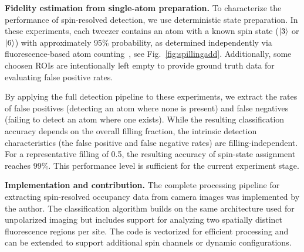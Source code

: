 \textbf{Fidelity estimation from single-atom preparation.}  
To characterize the performance of spin-resolved detection, we use deterministic state preparation. In these experiments, each tweezer contains an atom with a known spin state ($\left| 3 \right\rangle$ or $\left| 6 \right\rangle$) with approximately 95\% probability, as determined independently via fluorescence-based atom counting~\cite{dux_optical_2023}, see Fig.~\ref{fig:spillingadd}. Additionally, some choosen ROIs are intentionally left empty to provide ground truth data for evaluating false positive rates.

By applying the full detection pipeline to these experiments, we extract the rates of false positives (detecting an atom where none is present) and false negatives (failing to detect an atom where one exists). While the resulting classification accuracy depends on the overall filling fraction, the intrinsic detection characteristics (the false positive and false negative rates) are filling-independent. For a representative filling of 0.5, the resulting accuracy of spin-state assignment reaches 99\%. This performance level is sufficient for the current experiment stage.

\textbf{Implementation and contribution.}  
The complete processing pipeline for extracting spin-resolved occupancy data from camera images was implemented by the author. The classification algorithm builds on the same architecture used for unpolarized imaging but includes support for analyzing two spatially distinct fluorescence regions per site. The code is vectorized for efficient processing and can be extended to support additional spin channels or dynamic configurations.

